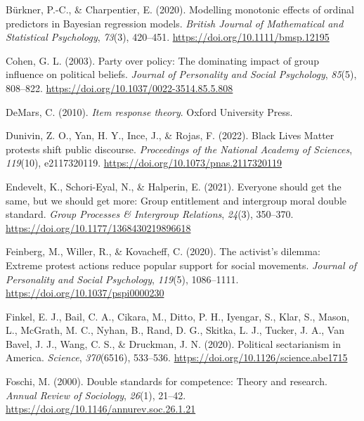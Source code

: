 \documentclass[12pt, letterpaper]{article}
\newenvironment{CSLReferences}[2]{}{}
\begin{document}
\begin{CSLReferences}{1}{0}
\leavevmode{}%
Bürkner, P.-C., \& Charpentier, E. (2020). Modelling monotonic effects
of ordinal predictors in {Bayesian} regression models. \emph{British
Journal of Mathematical and Statistical Psychology}, \emph{73}(3),
420--451. \url{https://doi.org/10.1111/bmsp.12195}

\leavevmode{}%
Cohen, G. L. (2003). Party over policy: The dominating impact of group
influence on political beliefs. \emph{Journal of Personality and Social
Psychology}, \emph{85}(5), 808--822.
\url{https://doi.org/10.1037/0022-3514.85.5.808}

\leavevmode{}%
DeMars, C. (2010). \emph{Item response theory}. Oxford University Press.

\leavevmode{}%
Dunivin, Z. O., Yan, H. Y., Ince, J., \& Rojas, F. (2022). Black {Lives}
{Matter} protests shift public discourse. \emph{Proceedings of the
National Academy of Sciences}, \emph{119}(10), e2117320119.
\url{https://doi.org/10.1073/pnas.2117320119}

\leavevmode{}%
Endevelt, K., Schori-Eyal, N., \& Halperin, E. (2021). Everyone should
get the same, but we should get more: Group entitlement and intergroup
moral double standard. \emph{Group Processes \& Intergroup Relations},
\emph{24}(3), 350--370. \url{https://doi.org/10.1177/1368430219896618}

\leavevmode{}%
Feinberg, M., Willer, R., \& Kovacheff, C. (2020). The activist's
dilemma: {Extreme} protest actions reduce popular support for social
movements. \emph{Journal of Personality and Social Psychology},
\emph{119}(5), 1086--1111. \url{https://doi.org/10.1037/pspi0000230}

\leavevmode{}%
Finkel, E. J., Bail, C. A., Cikara, M., Ditto, P. H., Iyengar, S., Klar,
S., Mason, L., McGrath, M. C., Nyhan, B., Rand, D. G., Skitka, L. J.,
Tucker, J. A., Van Bavel, J. J., Wang, C. S., \& Druckman, J. N. (2020).
Political sectarianism in {America}. \emph{Science}, \emph{370}(6516),
533--536. \url{https://doi.org/10.1126/science.abe1715}

\leavevmode{}%
Foschi, M. (2000). Double standards for competence: Theory and research.
\emph{Annual Review of Sociology}, \emph{26}(1), 21--42.
\url{https://doi.org/10.1146/annurev.soc.26.1.21}


\end{CSLReferences}
\end{document}
